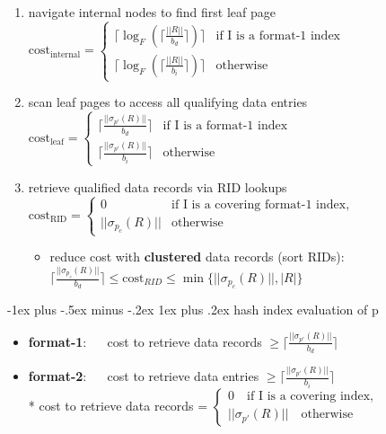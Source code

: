 \documentclass[9pt, landscape]{extarticle}
\makeatletter
\renewcommand{\subsubsection}{\@startsection{subsubsection}{3}{0mm}%
  {-1ex plus -.5ex minus -.2ex}%
  {1ex plus .2ex}%
{\normalfont\small\bfseries}}%
\makeatother
\begin{document}
\begin{multicols*}{4}
  \begin{enumerate}
    \item navigate internal nodes to find first leaf page
      \( {\displaystyle{ 
          \text{cost}_{\text{internal}}=
          \begin{cases}
            \lceil \log_F ( \lceil \frac{||R||}{b_d} \rceil )\rceil &\text{if $$I$$ is a format-1 index}\\
            \lceil \log_F ( \lceil 
            \frac{||R||}{b_i} \rceil )\rceil  &\text{otherwise}
          \end{cases}
      }} \) 
    \item scan leaf pages to access all qualifying data entries
      \( {\displaystyle{ 
          \text{cost}_{\text{leaf}}=
          \begin{cases}
            \lceil \frac{||\sigma_{p'}(R)||}{b_d} \rceil &\text{if $$I$$ is a format-1 index}\\
            \lceil \frac{||\sigma_{p'}(R)||}{b_i} \rceil &\text{otherwise}
          \end{cases}
      }} \) 
    \item retrieve qualified data records via RID lookups
      \( {\displaystyle{ 
          \text{cost}_{\text{RID}}=
          \begin{cases}
            0 &\text{if $$I$$ is a covering format-1 index,}\\
            ||\sigma_{p_c}(R)||  &\text{otherwise}
          \end{cases}
      }} \) 
      \begin{itemize}
        \item reduce cost with \textbf{clustered} data records (sort RIDs): 
          $\lceil\frac{||\sigma_{p_c}(R)||}{b_d}\rceil \leq \text{cost}_{RID} \leq \min\{||\sigma_{p_c}(R)||, |R|\}$
      \end{itemize}
  \end{enumerate}

  \subsubsection{hash index evaluation of p}

  \begin{itemize}
    \item \textbf{format-1}: $\quad$ cost to retrieve data records $ \geq \lceil\frac{||\sigma_{p'}(R)||}{b_d}\rceil $
    \item \textbf{format-2}: $\quad$ cost to retrieve data entries $ \geq \lceil\frac{||\sigma_{p'}(R)||}{b_i}\rceil $ 
      \\* cost to retrieve data records = $ \begin{cases} 0 \quad \text{if $$I$$ is a covering index,}\\
        ||\sigma_{p'}(R)||  \quad \text{otherwise}
      \end{cases} $
  \end{itemize}



\end{multicols*}
\end{document}

